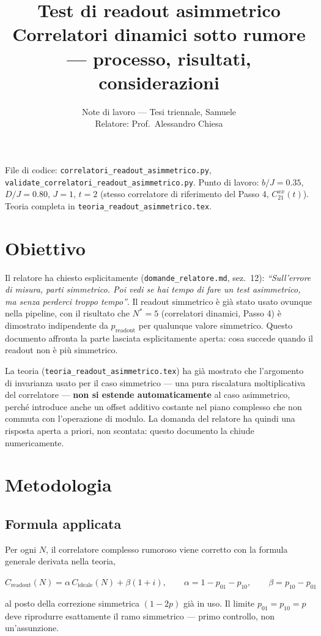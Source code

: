 \documentclass[11pt,a4paper]{article}
\title{\vspace{-1.5em}\color{inkblue}Test di readout asimmetrico\\[0.2em]
\Large\normalfont\color{softgray}Correlatori dinamici sotto rumore --- processo, risultati, considerazioni}
\author{Note di lavoro --- Tesi triennale, Samuele\\ Relatore: Prof.\ Alessandro Chiesa}
\date{}
\begin{document}
\sloppy
\maketitle
\thispagestyle{fancy}
\vspace{-2.0em}

File di codice: \texttt{correlatori\_readout\_asimmetrico.py},
\texttt{validate\_\allowbreak correlatori\_readout\_asimmetrico.py}. Punto di lavoro:
$b/J=0.35$, $D/J=0.80$, $J=1$, $t=2$ (stesso correlatore di riferimento
del Passo 4, $C_{21}^{xx}(t)$). Teoria completa in
\texttt{teoria\_readout\_asimmetrico.tex}.

\tableofcontents

\section{Obiettivo}

Il relatore ha chiesto esplicitamente (\texttt{domande\_relatore.md},
sez.~12): \emph{``Sull'errore di misura, parti simmetrico. Poi vedi se hai
tempo di fare un test asimmetrico, ma senza perderci troppo tempo''}. Il
readout simmetrico è già stato usato ovunque nella pipeline, con il
risultato che $N^*=5$ (correlatori dinamici, Passo 4) è dimostrato
indipendente da $p_\text{readout}$ per qualunque valore simmetrico. Questo
documento affronta la parte lasciata esplicitamente aperta: cosa succede
quando il readout non è più simmetrico.

La teoria (\texttt{teoria\_readout\_asimmetrico.tex}) ha già mostrato che
l'argomento di invarianza usato per il caso simmetrico --- una pura
riscalatura moltiplicativa del correlatore --- \textbf{non si estende
automaticamente} al caso asimmetrico, perché introduce anche un offset
additivo costante nel piano complesso che non commuta con l'operazione di
modulo. La domanda del relatore ha quindi una risposta aperta a priori,
non scontata: questo documento la chiude numericamente.

\section{Metodologia}

\subsection{Formula applicata}

Per ogni $N$, il correlatore complesso rumoroso viene corretto con la
formula generale derivata nella teoria,
\begin{keyeq}
\centering
$C_\text{readout}(N) = \alpha\,C_\text{ideale}(N) + \beta(1+i), \qquad
\alpha = 1-p_{01}-p_{10}, \qquad \beta = p_{10}-p_{01}$
\end{keyeq}
al posto della correzione simmetrica $(1-2p)$ già in uso. Il limite
$p_{01}=p_{10}=p$ deve riprodurre esattamente il ramo simmetrico --- primo
controllo, non un'assunzione.
\end{document}
